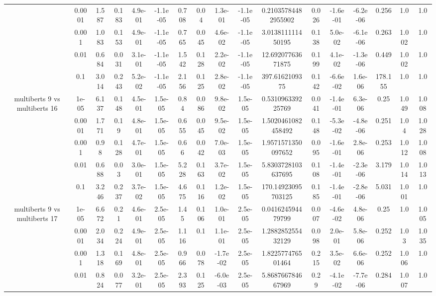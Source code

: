 \begin{tabular}{|c|c|c|c|c|c|c|c|c|c|c|c|c|c|c|c|c|}
 & 0.0001 & 1.587 & 0.183 & 4.9e-01 & -1.1e-05 & 0.708 & 0.04 & 1.3e-01 & -1.1e-05 & 0.21035784482955902 & 0.026 & -1.6e-01 & -6.2e-06 & 0.256 & 1.0 & 1.0 \\
 & 0.001 & 1.083 & 0.153 & 4.9e-01 & -1.1e-05 & 0.765 & 0.045 & 4.6e-02 & -1.1e-05 & 3.013811111450195 & 0.138 & 5.0e-02 & -6.1e-06 & 0.263 & 1.002 & 1.0 \\
 & 0.01 & 0.684 & 0.031 & 3.1e-01 & -1.1e-05 & 1.542 & 0.128 & 2.2e-02 & -1.1e-05 & 12.69207763671875 & 0.199 & 4.1e-02 & -1.3e-06 & 0.449 & 1.002 & 1.0 \\
 & 0.1 & 3.014 & 0.243 & 5.2e-02 & -1.1e-05 & 2.156 & 0.125 & 2.8e-02 & -1.1e-05 & 397.6162109375 & 0.142 & -6.6e-02 & 1.6e-06 & 178.155 & 1.0 & 1.0 \\
\hline
\multirow{5}{*}{multiberts 9 vs multiberts 16} & 1e-05 & 6.137 & 0.148 & 4.5e-01 & 1.5e-05 & 0.84 & 0.086 & 9.8e-02 & 1.5e-05 & 0.531096339225769 & 0.041 & -1.4e-01 & 6.3e-06 & 0.25 & 1.049 & 1.008 \\
 & 0.0001 & 1.771 & 0.19 & 4.8e-01 & 1.5e-05 & 0.655 & 0.045 & 9.5e-02 & 1.5e-05 & 1.5020461082458492 & 0.148 & -5.3e-02 & -4.8e-06 & 0.251 & 1.04 & 1.028 \\
 & 0.001 & 0.98 & 0.128 & 4.7e-01 & 1.5e-05 & 0.66 & 0.042 & 7.0e-03 & 1.5e-05 & 1.9571571350097652 & 0.095 & -1.6e-01 & 2.8e-06 & 0.253 & 1.012 & 1.008 \\
 & 0.01 & 0.688 & 0.03 & 3.0e-01 & 1.5e-05 & 5.228 & 0.163 & 3.7e-02 & 1.5e-05 & 5.8303728103637695 & 0.108 & -1.4e-01 & -2.3e-06 & 3.179 & 1.014 & 1.013 \\
 & 0.1 & 3.246 & 0.237 & 3.7e-02 & 1.5e-05 & 4.675 & 0.116 & 1.2e-02 & 1.5e-05 & 170.14923095703125 & 0.185 & -1.4e-01 & -2.8e-06 & 5.031 & 1.001 & 1.0 \\
\hline
\multirow{5}{*}{multiberts 9 vs multiberts 17} & 1e-05 & 6.672 & 0.21 & 4.6e-01 & 2.5e-05 & 1.45 & 0.106 & 1.0e-01 & 2.5e-05 & 0.041624594479799 & 0.007 & -4.6e-02 & 4.8e-06 & 0.25 & 1.0 & 1.005 \\
 & 0.0001 & 2.034 & 0.224 & 4.9e-01 & 2.5e-05 & 1.116 & 0.1 & 1.1e-01 & 2.5e-05 & 1.288285255432129 & 0.098 & 2.0e-01 & 5.8e-06 & 0.252 & 1.03 & 1.035 \\
 & 0.001 & 1.318 & 0.169 & 4.8e-01 & 2.5e-05 & 0.966 & 0.078 & -1.7e-02 & 2.5e-05 & 1.822577476501464 & 0.215 & 3.5e-02 & 6.6e-06 & 0.252 & 1.006 & 1.0 \\
 & 0.01 & 0.824 & 0.077 & 3.2e-01 & 2.5e-05 & 2.393 & 0.125 & -6.0e-03 & 2.5e-05 & 5.868766784667969 & 0.29 & -4.1e-02 & -7.7e-06 & 0.284 & 1.007 & 1.0 \\

\end{tabular}
